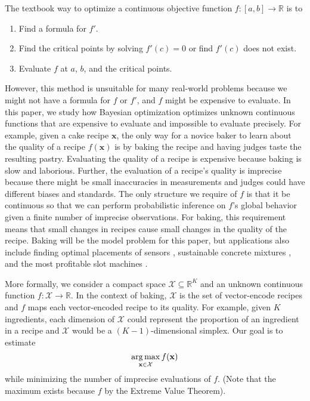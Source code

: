 The textbook way to optimize a continuous objective function $f: [a, b] \to \mathbb{R}$ is to
\begin{enumerate}
    \item Find a formula for $f'$.
    \item Find the critical points by solving $f'(c) = 0$ or find $f'(c)$ does not exist.
    \item Evaluate $f$ at $a$, $b$, and the critical points.
\end{enumerate}
However, this method is unsuitable for many real-world problems because
we might not have a formula for $f$ or $f'$, and $f$ might be expensive to evaluate.
In this paper, we study how Bayesian optimization optimizes unknown continuous functions that are expensive to evaluate and impossible to evaluate precisely.
For example, given a cake recipe $\mathbf{x}$, the only way for a novice baker to learn about
the quality of a recipe $f(\mathbf{x})$ is by baking the recipe and having judges taste the resulting pastry.
Evaluating the quality of a recipe is expensive because baking is slow and laborious.
Further, the evaluation of a recipe's quality is imprecise because there might be small inaccuracies in measurements
and judges could have different biases and standards.
The only structure we require of $f$ is that it be continuous so that we can perform probabilistic inference on $f$'s global behavior given 
a finite number of imprecise observations.
For baking, this requirement means that small changes in recipes cause small changes in the quality of the recipe.
Baking will be the model problem for this paper, but applications also
include finding optimal placements of sensors \cite{capl2017}, sustainable concrete mixtures \cite{ament2023},
and the most profitable slot machines \cite{shahriari2016}.

More formally, we consider a compact space $\mathcal{X} \subseteq \mathbb{R}^{K}$  and an unknown continuous function $f: \mathcal{X} \to \mathbb{R}$.
In the context of baking, $\mathcal{X}$ is the set of vector-encode recipes
and $f$ maps each vector-encoded recipe to its quality.
For example, given $K$ ingredients, each dimension of $\mathcal{X}$ could represent the proportion of an ingredient in a recipe
and $\mathcal{X}$ would be a $(K - 1)$-dimensional simplex.
Our goal is to estimate
\begin{equation}\label{eq:obj}
    \operatorname*{arg\,max}_{\mathbf{x} \in \mathcal{X}} f(\mathbf{x})
\end{equation}
while minimizing the number of imprecise evaluations of $f$.
(Note that the maximum exists because $f$ by the Extreme Value Theorem).

